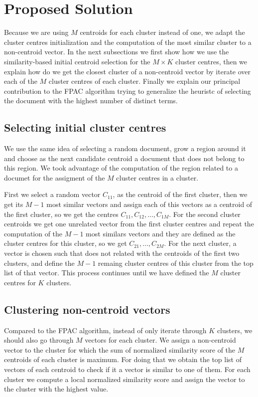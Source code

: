 \documentclass[runningheads]{llncs}
\begin{document}
\section{Proposed Solution}

Because we are using $M$ centroids for each cluster instead of one,
we adapt the cluster centres initialization and the computation
of the most similar cluster to a non-centroid vector.
In the next subsections we first show how we use the similarity-based
initial centroid selection for the $M \times K$ cluster centres,
then we explain how do we get the closest cluster of a non-centroid
vector by iterate over each of the $M$ cluster centres of each cluster.
Finally we explain our principal contribution to the FPAC algorithm
trying to generalize the heuristc of selecting the document
with the highest number of distinct terms.


\subsection{Selecting initial cluster centres}

We use the same idea of selecting a random document, grow a region around it and choose as the next candidate centroid a document that does not belong to this region. We took advantage of the computation of the region related to a documet for the assigment of the $M$ cluster centres in a cluster.

First we select a random vector $C_{11}$, as the centroid of the first cluster, then we get its $M - 1$ most similar vectors and assign each of
this vectors as a centroid of the first cluster, so we get the centres 
$C_{11}, C_{12},  \dots, C_{1M}$. For the second cluster centroids
we get one unrelated vector from the first cluster centres and 
repeat the computation of the $M-1$ most similars vectors and they are defined as the cluster centres for this cluster, so we get $C_{21}, \dots, C_{2M}$.
For the next cluster, a vector is chosen such that does not related with the centroids of the first two clusters, and define the $M-1$ remaing cluster centres of this cluster from the top list of that vector. This process continues until we have defined the $M$ cluster centres for $K$ clusters.

\subsection{Clustering non-centroid vectors}

Compared to the FPAC algorithm, instead of only iterate through
$K$ clusters, we should also go through $M$ vectors for each cluster.
We assign a non-centroid vector to the cluster for which the sum of 
normalized similarity score of the $M$ centroids of each cluster is maximum.
For doing that we obtain the top list of vectors of each centroid to check if it a vector is similar to one of them. For each cluster we compute a local normalized similarity score and assign the vector to the cluster with the highest value.
\end{document}
